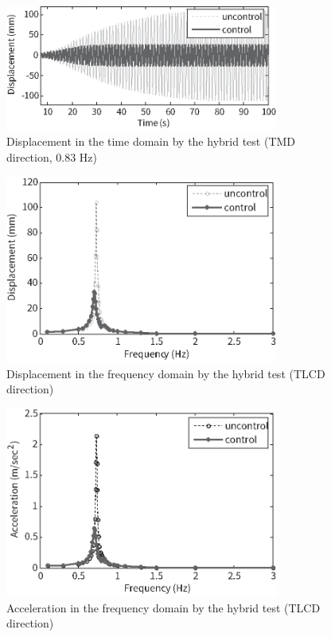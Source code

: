 \begin{figure}[ht]
\centering
\includegraphics[width=0.8\textwidth] {figure/5-21.eps}
\caption{Displacement in the time domain by the hybrid test (TMD direction, 0.83 Hz)}
\label{fig:5-21}
\end{figure}

\begin{figure}[ht]
\centering
\includegraphics[width=0.8\textwidth] {figure/5-22.eps}
\caption{Displacement in the frequency domain by the hybrid test (TLCD direction)}
\label{fig:5-22}
\end{figure}

\begin{figure}[ht]
\centering
\includegraphics[width=0.8\textwidth] {figure/5-23.eps}
\caption{Acceleration in the frequency domain by the hybrid test (TLCD direction)}
\label{fig:5-23}
\end{figure}

